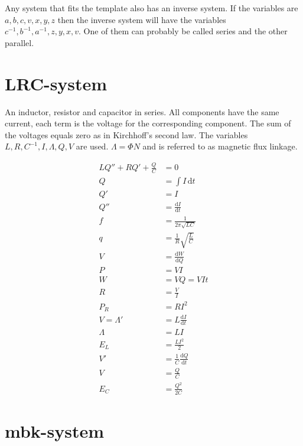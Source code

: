 \documentclass[]{../common/elementary-physics}
\begin{document}
Any system that fits the template also has an inverse system.
If the variables are $a,b,c,v,x,y,z$ then the inverse system will have the variables $c^{-1},b^{-1},a^{-1},z,y,x,v$.
One of them can probably be called series and the other parallel.

\pagebreak

\section{LRC-system}

An inductor, resistor and capacitor in series.
All components have the same current, each term is the voltage for the corresponding component.
The sum of the voltages equals zero as in Kirchhoff's second law.
The variables $L,R,C^{-1},I,\Lambda,Q,V$ are used.
$\Lambda = \Phi N$ and is referred to as magnetic flux linkage.

\begin{subequations}
\begin{align}
L Q'' + R Q' + \frac{Q}{C} &= 0 \\
Q &= \int I \, \mathrm{d}t \\
Q' &= I \tag{definition of current} \\
Q'' &= \frac{\mathrm{d}I}{\mathrm{d}t} \\
f &= \frac{1}{2 \pi \sqrt{L C}} \tag{frequency} \\
q &= \frac{1}{R} \sqrt{\frac{L}{C}} \tag{quality factor}\\
V &= \frac{\mathrm{d}W}{\mathrm{d}Q} \\
P &= V I \tag{power} \\
W &= V Q = V I t \tag{work} \\
R &= \frac{V}{I} \tag{Ohm's law} \\
P_R &= R I^2 \tag{losses} \\
V = \Lambda' &= L \frac{\mathrm{d}I}{\mathrm{d}t} \tag{Faraday's law} \\
\Lambda &= L I \tag{definition of inductance} \\
E_L &= \frac{L I^2}{2} \tag{energy in a coil} \\
V' &= \frac{1}{C} \frac{\mathrm{d}Q}{\mathrm{d}t} \\
V &= \frac{Q}{C} \\
E_C &= \frac{Q^2}{2 C} \tag{energy} 
\end{align}
\end{subequations}

\pagebreak

\section{mbk-system}
\end{document}
